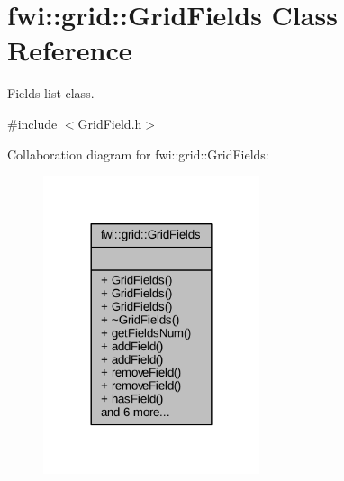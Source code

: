 \hypertarget{classfwi_1_1grid_1_1GridFields}{\section{fwi\-:\-:grid\-:\-:Grid\-Fields Class Reference}
\label{classfwi_1_1grid_1_1GridFields}
}


Fields list class.  




{\ttfamily \#include $<$Grid\-Field.\-h$>$}



Collaboration diagram for fwi\-:\-:grid\-:\-:Grid\-Fields\-:\nopagebreak
\begin{figure}[H]
\begin{center}
\leavevmode
\includegraphics[width=180pt]{classfwi_1_1grid_1_1GridFields__coll__graph}
\end{center}
\end{figure}
